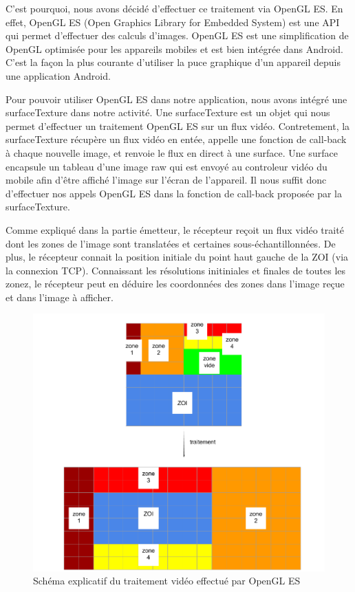 \documentclass[11pt,a4paper]{article}
\begin{document}
\bigbreak
C'est pourquoi, nous avons décidé d'effectuer ce traitement via OpenGL ES.
En effet, OpenGL ES (Open Graphics Library for Embedded System) est une API qui permet d'effectuer des calculs d'images. 
OpenGL ES est une simplification de OpenGL optimisée pour les appareils mobiles et est bien intégrée dans Android.
C'est la façon la plus courante d'utiliser la puce graphique d'un appareil depuis une application Android.

\bigbreak
Pour pouvoir utiliser OpenGL ES dans notre application, nous avons intégré une surfaceTexture dans notre activité.
Une surfaceTexture est un objet qui nous permet d'effectuer un traitement OpenGL ES sur un flux vidéo.
Contretement, la surfaceTexture récupère un flux vidéo en entée, appelle une fonction de call-back à chaque nouvelle image, et renvoie le flux en direct à une surface.
Une surface encapsule un tableau d'une image raw qui est envoyé au controleur vidéo du mobile afin d'être affiché l'image sur l'écran de l'appareil.
Il nous suffit donc d'effectuer nos appels OpenGL ES dans la fonction de call-back proposée par la surfaceTexture.

\bigbreak
Comme expliqué dans la partie émetteur, le récepteur reçoit un flux vidéo traité dont les zones de l'image sont translatées et certaines sous-échantillonnées.
De plus, le récepteur connait la position initiale du point haut gauche de la ZOI (via la connexion TCP).
Connaissant les résolutions initiniales et finales de toutes les zonez, le récepteur peut en déduire les coordonnées des zones dans l'image reçue et dans l'image à afficher.

\begin{figure}[H]
\begin{center}
\includegraphics[scale=0.35]{images/schema_traitement_video_retour.png}
\end{center}
\caption{Schéma explicatif du traitement vidéo effectué par OpenGL ES}
\label{}
\end{figure}
\end{document}
